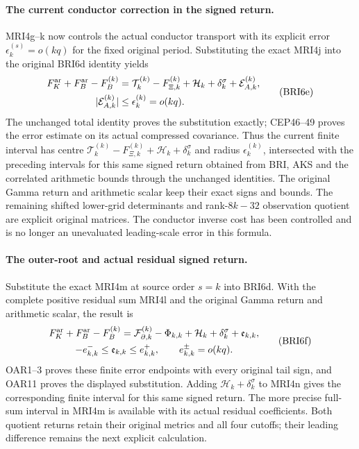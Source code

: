 \documentclass[11pt,a4paper]{article}
\begin{document}
\paragraph{The current conductor correction in the signed return.}
MRI4g--k now controls the actual conductor transport with its explicit
error $\epsilon_k^{(s)}=o(kq)$ for the fixed original period.
Substituting the exact MRI4j into the original BRI6d identity yields
\[
 \begin{split}
 F_K^{\rm ar}+F_B^{\rm ar}-F_B^{(k)}
 &=\mathcal T_k^{(k)}-F_{\Xi,k}^{(k)}
       +\mathcal H_k+\delta_k^\sigma+\mathcal E_{A,k}^{(k)},\\
 |\mathcal E_{A,k}^{(k)}|&\le\epsilon_k^{(k)}=o(kq).
 \end{split}\tag{BRI6e}
\]
The unchanged total identity proves the substitution exactly;
CEP46--49 proves the error estimate on its actual compressed
covariance. Thus the current finite interval has centre
$\mathcal T_k^{(k)}-F_{\Xi,k}^{(k)}+\mathcal H_k+\delta_k^\sigma$
and radius $\epsilon_k^{(k)}$, intersected with the preceding
intervals for this same signed return obtained from BRI, AKS and
the correlated arithmetic bounds through the unchanged identities.
The original Gamma return
and arithmetic scalar keep their exact signs and bounds.
The remaining shifted lower-grid determinants and rank-$8k-32$
observation quotient are explicit original matrices. The conductor
inverse cost has been controlled and is no longer an unevaluated
leading-scale error in this formula.


\paragraph{The outer-root and actual residual signed return.}
Substitute the exact MRI4m at source order $s=k$ into BRI6d.
With the complete positive residual sum MRI4l and the original
Gamma return and arithmetic scalar, the result is
\[
 \begin{gathered}
 F_K^{\rm ar}+F_B^{\rm ar}-F_B^{(k)}
   =\mathcal F_{\partial,k}^{(k)}-\Phi_{k,k}
        +\mathcal H_k+\delta_k^\sigma+\mathfrak e_{k,k},\\
 -e_{k,k}^-\le\mathfrak e_{k,k}\le e_{k,k}^+,\qquad
 e_{k,k}^\pm=o(kq).
 \end{gathered}\tag{BRI6f}
\]
OAR1--3 proves these finite error endpoints with every original
tail sign, and OAR11 proves the displayed substitution. Adding
$\mathcal H_k+\delta_k^\sigma$ to MRI4n gives the corresponding
finite interval for this same signed return. The more precise
full-sum interval in MRI4m is available with its actual residual
coefficients. Both quotient returns retain their original metrics
and all four cutoffs; their leading difference remains the next
explicit calculation.
\end{document}
